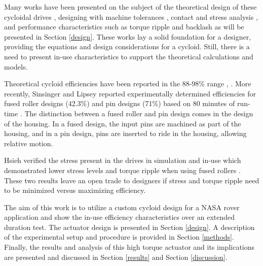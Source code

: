 Many works have been presented on the subject of the theoretical design of these cycloidal drives \cite{ref:on_the_lobe} \cite{ref:hwang_hsieh}, designing with machine tolerances \cite{ref:design_and_application}, contact and stress analysis \cite{ref:li}, and performance characteristics such as torque ripple and backlash \cite{ref:hsieh_traditional} \cite{ref:hsieh_dynamics} as will be presented in Section \ref{design}.
These works lay a solid foundation for a designer, providing the equations and design considerations for a cycloid.
Still, there is a need to present in-use characteristics to support the theoretical calculations and models.

Theoretical cycloid efficiencies have been reported in the 88-98\% range \cite{ref:Malhorta}, \cite{ref:unified_approach}.
More recently, Sinsinger and Lipsey reported experimentally determined efficiencies for fused roller designs (42.3\%) and pin designs (71\%) based on 80 minutes of run-time \cite{ref:cycloid_vs_harmonic}.
The distinction between a fused roller and pin design comes in the design of the housing.
In a fused design, the input pins are machined as part of the housing, and in a pin design, pins are inserted to ride in the housing, allowing relative motion.

Hsieh verified the stress present in the drives in simulation and in-use which demonstrated lower stress levels and torque ripple when using fused rollers \cite{ref:hsieh_dynamics}.
These two results leave an open trade to designers if stress and torque ripple need to be minimized versus maximizing efficiency.

The aim of this work is to utilize a custom cycloid design for a NASA rover application and show the in-use efficiency characteristics over an extended duration test.
The actuator design is presented in Section \ref{design}.
A description of the experimental setup and procedure is provided in Section \ref{methods}.
Finally, the results and analysis of this high torque actuator and its implications are presented and discussed in Section \ref{results} and Section \ref{discussion}.

